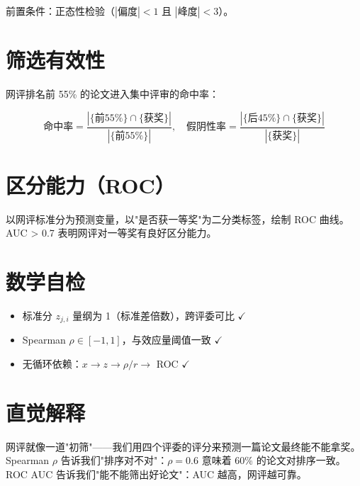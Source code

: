\documentclass[UTF8]{ctexart}
\begin{document}
前置条件：正态性检验（$|\text{偏度}| < 1$ 且 $|\text{峰度}| < 3$）。

\section{筛选有效性}

网评排名前 55\% 的论文进入集中评审的命中率：

\begin{equation}
\text{命中率} = \frac{|\{\text{前55\%}\} \cap \{\text{获奖}\}|}{|\{\text{前55\%}\}|}, \quad
\text{假阴性率} = \frac{|\{\text{后45\%}\} \cap \{\text{获奖}\}|}{|\{\text{获奖}\}|}
\end{equation}

\section{区分能力（ROC）}

以网评标准分为预测变量，以"是否获一等奖"为二分类标签，绘制 ROC 曲线。
AUC > 0.7 表明网评对一等奖有良好区分能力。

\section{数学自检}

\begin{itemize}
\item 标准分 $z_{j,i}$ 量纲为 1（标准差倍数），跨评委可比 $\checkmark$
\item Spearman $\rho \in [-1,1]$，与效应量阈值一致 $\checkmark$
\item 无循环依赖：$x \to z \to \rho/r \to$ ROC $\checkmark$
\end{itemize}

\section{直觉解释}

网评就像一道"初筛"——我们用四个评委的评分来预测一篇论文最终能不能拿奖。Spearman $\rho$ 告诉我们"排序对不对"：$\rho=0.6$ 意味着 60\% 的论文对排序一致。ROC AUC 告诉我们"能不能筛出好论文"：AUC 越高，网评越可靠。
\end{document}
